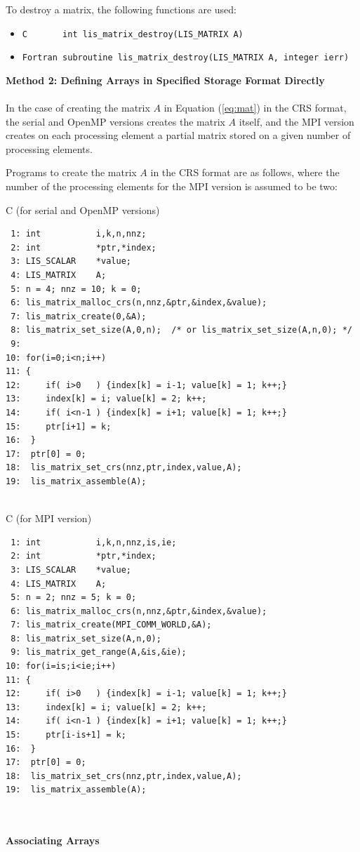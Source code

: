 \documentclass[a4paper]{article}
\begin{document}
To destroy a matrix, the following functions are used:
\begin{itemize}
\item \verb|C       int lis_matrix_destroy(LIS_MATRIX A)|
\item \verb|Fortran subroutine lis_matrix_destroy(LIS_MATRIX A, integer ierr)|
\end{itemize}
\vspace*{5mm}
{\bf Method 2: Defining Arrays in Specified Storage Format Directly}\\
\\ 
\indent
In the case of creating the matrix $A$ in Equation (\ref{eq:mat}) in the CRS format, 
the serial and OpenMP versions creates the matrix $A$ itself, and the MPI version
creates on each processing element a partial matrix stored on a given number of processing elements. 

Programs to create the matrix $A$ in the CRS format are as follows,
where the number of the processing elements for the MPI version is assumed to be two: 
\begin{itembox}[l]{C (for serial and OpenMP versions)}
\small
\begin{verbatim}
 1: int           i,k,n,nnz;
 2: int           *ptr,*index;
 3: LIS_SCALAR    *value;
 4: LIS_MATRIX    A;
 5: n = 4; nnz = 10; k = 0;
 6: lis_matrix_malloc_crs(n,nnz,&ptr,&index,&value);
 7: lis_matrix_create(0,&A);
 8: lis_matrix_set_size(A,0,n);  /* or lis_matrix_set_size(A,n,0); */ 
 9: 
10: for(i=0;i<n;i++)
11: {
12:     if( i>0   ) {index[k] = i-1; value[k] = 1; k++;}
13:     index[k] = i; value[k] = 2; k++;
14:     if( i<n-1 ) {index[k] = i+1; value[k] = 1; k++;}
15:     ptr[i+1] = k;
16:  }
17:  ptr[0] = 0;
18:  lis_matrix_set_crs(nnz,ptr,index,value,A);
19:  lis_matrix_assemble(A); 


\end{verbatim}
\end{itembox}
\begin{itembox}[l]{C (for MPI version)}
\small
\begin{verbatim}
 1: int           i,k,n,nnz,is,ie;
 2: int           *ptr,*index;
 3: LIS_SCALAR    *value;
 4: LIS_MATRIX    A;
 5: n = 2; nnz = 5; k = 0;
 6: lis_matrix_malloc_crs(n,nnz,&ptr,&index,&value);
 7: lis_matrix_create(MPI_COMM_WORLD,&A);
 8: lis_matrix_set_size(A,n,0);
 9: lis_matrix_get_range(A,&is,&ie);
10: for(i=is;i<ie;i++)
11: {
12:     if( i>0   ) {index[k] = i-1; value[k] = 1; k++;}
13:     index[k] = i; value[k] = 2; k++;
14:     if( i<n-1 ) {index[k] = i+1; value[k] = 1; k++;}
15:     ptr[i-is+1] = k;
16:  }
17:  ptr[0] = 0;
18:  lis_matrix_set_crs(nnz,ptr,index,value,A);
19:  lis_matrix_assemble(A); 
\end{verbatim}
\end{itembox}
\\ \\
\noindent
{\bf Associating Arrays}
\end{document}

